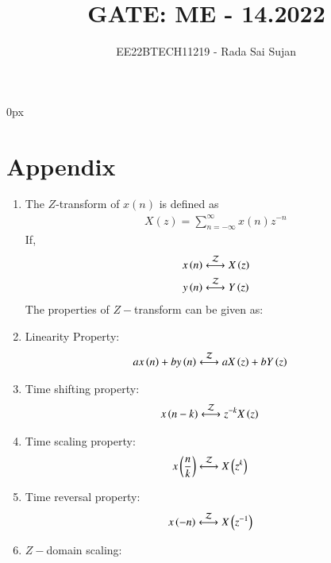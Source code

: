\documentclass[journal,12pt,twocolumn]{IEEEtran}
\theoremstyle{remark}
\begin{document}
\parindent 0px

\title{GATE: ME - 14.2022}
\author{EE22BTECH11219 - Rada Sai Sujan$^{}$%
}
\maketitle
\newpage
\bigskip
\section*{Appendix}
\begin{enumerate}
    \item
	The $Z$-transform of $x(n)$ is defined as
    \begin{align}
        X(z) = \sum_{n=-\infty}^{\infty}x(n)z^{-n}
    \end{align}
    If,
    \begin{align}
        x\left(n\right)&\overset{\mathcal{Z}}{ \longleftrightarrow}X\left(z\right)  \\
        y\left(n\right)&\overset{\mathcal{Z}}{ \longleftrightarrow}Y\left(z\right)
    \end{align}
    The properties of $Z-$transform can be given as:
    \item Linearity Property:    \\
    \begin{align}
        ax\left(n\right)+by\left(n\right)&\overset{\mathcal{Z}}{ \longleftrightarrow}aX\left(z\right)+bY\left(z\right)
    \end{align}
    \item Time shifting property:    \\
    \begin{align}
        x\left(n-k\right)&\overset{\mathcal{Z}}{ \longleftrightarrow}z^{-k}X\left(z\right)
    \end{align}
    \item Time scaling property: \\
    \begin{align}
    x\left(\frac{n}{k}\right)&\overset{\mathcal{Z}}{ \longleftrightarrow}X\left(z^k\right)
    \end{align}
    \item Time reversal property:    \\
    \begin{align}
        x\left(-n\right)&\overset{\mathcal{Z}}{ \longleftrightarrow}X\left(z^{-1}\right)
    \end{align}
    \item $Z-$domain scaling:   \\
    \begin{align}

\end{align}
\end{enumerate}
\end{document}
